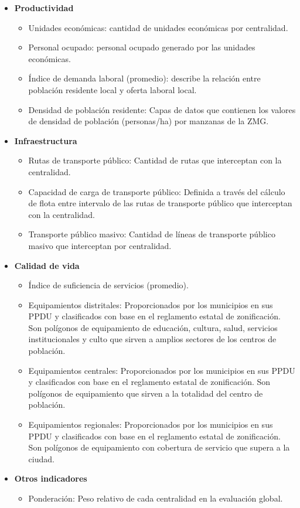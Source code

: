 \documentclass[openany]{book}
\begin{document}
				\begin{itemize}
					\item \textbf{Productividad}
					\begin{itemize}
						\item Unidades económicas: cantidad de unidades económicas por centralidad.
						\item Personal ocupado: personal ocupado generado por las unidades económicas.
						\item Índice de demanda laboral (promedio): describe la relación entre población residente local y oferta laboral local.
						\item Densidad de población residente: Capas de datos que contienen los valores de densidad de población (personas/ha) por manzanas de la ZMG.
					\end{itemize}

					\item \textbf{Infraestructura}
					\begin{itemize}
						\item Rutas de transporte público: Cantidad de rutas que interceptan con la centralidad.
						\item Capacidad de carga de transporte público: Definida a través del cálculo de flota entre intervalo de las rutas de transporte público que interceptan con la centralidad.
						\item Transporte público masivo: Cantidad de líneas de transporte público masivo que interceptan por centralidad.
					\end{itemize}

					\item \textbf{Calidad de vida}
					\begin{itemize}
						\item Índice de suficiencia de servicios (promedio).
						\item Equipamientos distritales: Proporcionados por los municipios en sus PPDU y clasificados con base en el reglamento estatal de zonificación. Son polígonos de equipamiento de educación, cultura, salud, servicios institucionales y culto que sirven a amplios sectores de los centros de población.
						\item Equipamientos centrales: Proporcionados por los municipios en sus PPDU y clasificados con base en el reglamento estatal de zonificación. Son polígonos de equipamiento que sirven a la totalidad del centro de población.
						\item Equipamientos regionales: Proporcionados por los municipios en sus PPDU y clasificados con base en el reglamento estatal de zonificación. Son polígonos de equipamiento con cobertura de servicio que supera a la ciudad.
					\end{itemize}

					\item \textbf{Otros indicadores}
					\begin{itemize}
						\item Ponderación: Peso relativo de cada centralidad en la evaluación global.
					\end{itemize}
				\end{itemize}
\end{document}
